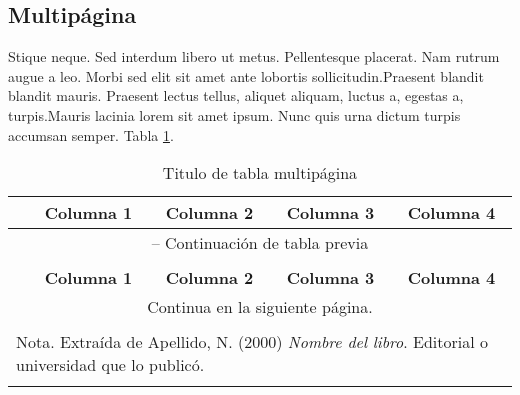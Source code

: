 \subsection{Multipágina}
Stique neque. Sed interdum libero ut metus.
Pellentesque placerat. Nam rutrum augue a leo. Morbi sed 
elit sit amet ante lobortis sollicitudin.Praesent blandit 
blandit mauris. Praesent lectus tellus, aliquet aliquam,
luctus a, egestas a, turpis.Mauris lacinia lorem sit amet
ipsum. Nunc quis urna dictum turpis accumsan semper. Tabla
\ref{tabla:tabla_largo_ejemplo}.\\

\begin{longtable}{p{2cm}|p{3cm}|p{3cm}|p{3cm}|p{3cm}|}
    \caption{Titulo de tabla multipágina} \label{tabla:tabla_largo_ejemplo} \\
    \cline{2-5}
    \multicolumn{1}{l|}{} & \multicolumn{1}{c|}{\textbf{Columna 1}} & \multicolumn{1}{c|}{\textbf{Columna 2}} & \multicolumn{1}{c|}{\textbf{Columna 3}} & \multicolumn{1}{c|}{\textbf{Columna 4}}\\ \hline
    \endfirsthead

    \multicolumn{5}{c}{{\tablename{} \thetable{} -- Continuación de tabla previa}} \\
    \multicolumn{5}{l}{} \\
    \cline{2-5}
    \multicolumn{1}{l|}{} & \multicolumn{1}{c|}{\textbf{Columna 1}} & \multicolumn{1}{c|}{\textbf{Columna 2}} & \multicolumn{1}{c|}{\textbf{Columna 3}} & \multicolumn{1}{c|}{\textbf{Columna 4}}\\ \hline
    \endhead

    \multicolumn{5}{c}{{Continua en la siguiente página.}} \\
    \endfoot

    \multicolumn{5}{l}{} \\
    \multicolumn{5}{l}{Nota. Extraída de Apellido, N. (2000) \textit{Nombre del libro}. Editorial o universidad que lo publicó.} \\
    \endlastfoot


\end{longtable}

